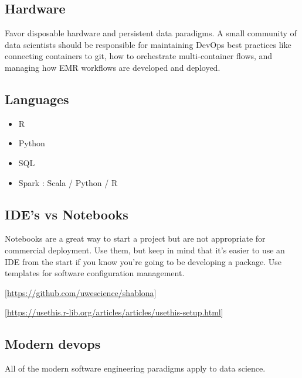 \documentclass[
  11pt,
]{book}
\providecommand{\tightlist}{%
  \setlength{\itemsep}{0pt}\setlength{\parskip}{0pt}}
\begin{document}
\hypertarget{hardware}{%
\subsection{Hardware}\label{hardware}}

Favor disposable hardware and persistent data paradigms. A small community of data scientists should be responsible for maintaining DevOps best practices like connecting containers to git, how to orchestrate multi-container flows, and managing how EMR workflows are developed and deployed.

\hypertarget{languages}{%
\subsection{Languages}\label{languages}}

\begin{itemize}
\tightlist
\item
  R
\item
  Python
\item
  SQL
\item
  Spark : Scala / Python / R
\end{itemize}

\hypertarget{ides-vs-notebooks}{%
\subsection{IDE's vs Notebooks}\label{ides-vs-notebooks}}

Notebooks are a great way to start a project but are not appropriate for commercial deployment. Use them, but keep in mind that it's easier to use an IDE from the start if you know you're going to be developing a package. Use templates for software configuration management.

{[}\url{https://github.com/uwescience/shablona}{]}

{[}\url{https://usethis.r-lib.org/articles/articles/usethis-setup.html}{]}

\hypertarget{modern-devops}{%
\subsection{Modern devops}\label{modern-devops}}

All of the modern software engineering paradigms apply to data science.
\end{document}
